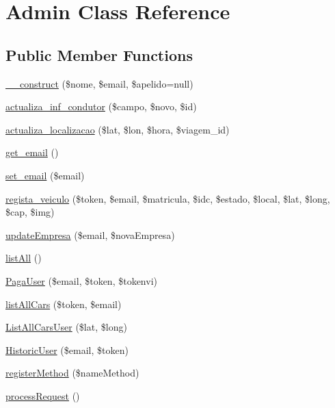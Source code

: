 \hypertarget{class_admin}{}\section{Admin Class Reference}
\label{class_admin}
\subsection*{Public Member Functions}
\begin{DoxyCompactItemize}
\item 
\hyperlink{class_admin_a234abd82474052805896aa1f3233a290}{\+\_\+\+\_\+construct} (\$nome, \$email, \$apelido=null)
\item 
\hyperlink{class_admin_ad747dd6dabb752d40ca8de78066cd40a}{actualiza\+\_\+inf\+\_\+condutor} (\$campo, \$novo, \$id)
\item 
\hyperlink{class_admin_a4e414743ef417898d5f60abe36c0943b}{actualiza\+\_\+localizacao} (\$lat, \$lon, \$hora, \$viagem\+\_\+id)
\item 
\hyperlink{class_admin_af76abee22772fe2860a5525c1b34a515}{get\+\_\+email} ()
\item 
\hyperlink{class_admin_a2dd5254b4f43ec19fcb59a139151922d}{set\+\_\+email} (\$email)
\item 
\hyperlink{class_admin_aaaf8e4d301da473bee9c562006ea8365}{regista\+\_\+veiculo} (\$token, \$email, \$matricula, \$idc, \$estado, \$local, \$lat, \$long, \$cap, \$img)
\item 
\hyperlink{class_admin_ac68e01e7272e94db31620ec08a713cd5}{update\+Empresa} (\$email, \$nova\+Empresa)
\item 
\hyperlink{class_admin_a36f36c993f4da045e541d3b8818a2734}{list\+All} ()
\item 
\hyperlink{class_admin_a085b2fbfd6ba829e1885a9420865e6af}{Paga\+User} (\$email, \$token, \$tokenvi)
\item 
\hyperlink{class_admin_ac44008f88899519293e89b36e4d3acc3}{list\+All\+Cars} (\$token, \$email)
\item 
\hyperlink{class_admin_a095a288cff96d3cf09569c174f5e0dc0}{List\+All\+Cars\+User} (\$lat, \$long)
\item 
\hyperlink{class_admin_a8984e73a0069f1818c85a35dd09c80ec}{Historic\+User} (\$email, \$token)
\item 
\hyperlink{class_admin_ab93521bcae8c90f705635a5788ce1def}{register\+Method} (\$name\+Method)
\item 
\hyperlink{class_admin_a3c934047380a0debb627d77d51bb85c8}{process\+Request} ()
\end{DoxyCompactItemize}

